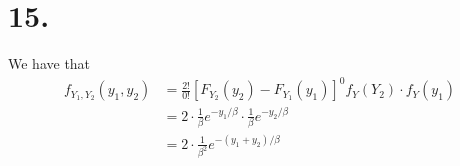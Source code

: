 \documentclass[11pt]{article}
\begin{document}
\section*{15.}
We have that 
\begin{equation*}
    \begin{aligned}
        f_{Y_1, Y_2}(y_1, y_2) &= \frac{2!}{0!} [F_{Y_2}(y_2) - F_{Y_1}(y_1)]^0 f_Y(Y_2) \cdot f_Y(y_1) \\
        &= 2 \cdot \frac{1}{\beta}e^{-y_1/\beta} \cdot \frac{1}{\beta}e^{-y_2/\beta}  \\
        &= 2 \cdot \frac{1}{\beta^2}e^{-(y_1+y_2)/\beta}
    \end{aligned}
\end{equation*}
\end{document}

